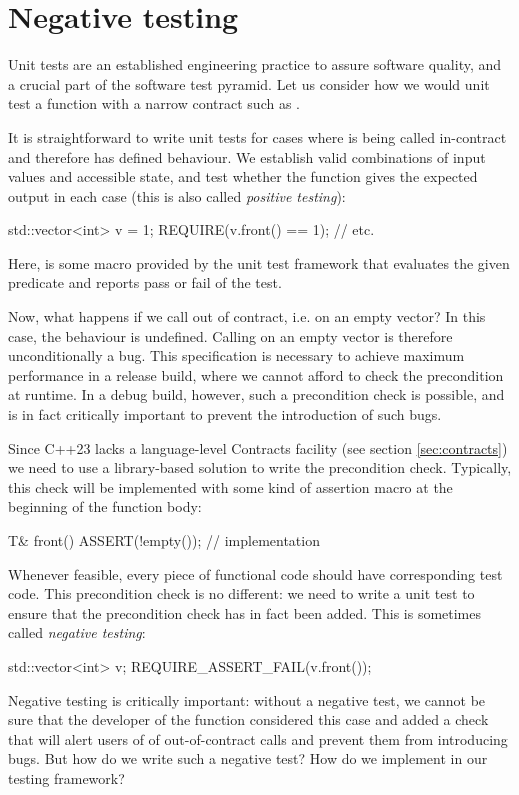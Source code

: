 \section{Negative testing}
\label{sec:negativetest}

Unit tests are an established engineering practice to assure software quality, and a crucial part of the software test pyramid. Let us consider how we would unit test a function with a narrow contract such as .

It is straightforward to write unit tests for cases where  is being called in-contract and therefore has defined behaviour. We establish valid combinations of input values and accessible state, and test whether the function gives the expected output in each case (this is also called \emph{positive testing}):
\begin{codeblock}
std::vector<int> v = {1};
REQUIRE(v.front() == 1);
// etc.
\end{codeblock}
Here,  is some macro provided by the unit test framework that evaluates the given predicate and reports pass or fail of the test.

Now, what happens if we call  out of contract, i.e. on an empty vector? In this case, the behaviour is undefined. Calling  on an empty vector is therefore unconditionally a bug. This specification is necessary to achieve maximum performance in a release build, where we cannot afford to check the precondition at runtime. In a debug build, however, such a precondition check is possible, and is in fact critically important to prevent the introduction of such bugs.

Since C++23 lacks a language-level Contracts facility (see section \ref{sec:contracts}) we need to use a library-based solution to write the precondition check. Typically, this check will be implemented with some kind of assertion macro at the beginning of the function body:
\begin{codeblock}
T& front() {
  ASSERT(!empty());
  // implementation
}
\end{codeblock}


Whenever feasible, every piece of functional code should have corresponding test code. This precondition check is no different: we need to write a unit test to ensure that the precondition check has in fact been added. This is sometimes called \emph{negative testing}:
\begin{codeblock}
std::vector<int> v;
REQUIRE_ASSERT_FAIL(v.front());
\end{codeblock}
Negative testing is critically important: without a negative test, we cannot be sure that the developer of the  function considered this case and added a check that will alert users of  of out-of-contract calls and prevent them from introducing bugs.
But how do we write such a negative test? How do we implement  in our testing framework?

